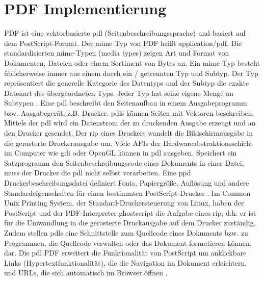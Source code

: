 \section{PDF Implementierung}
PDF ist eine vektorbasierte \gls{pdl} (Seitenbeschreibungssprache) und basiert auf dem PostScript-Format. Der \gls{mime} Typ von PDF heißt application/pdf. Die standardisierten \gls{mime}-Typen (media types) zeigen Art und Format von Dokumenten, Dateien oder einem Sortiment von Bytes an. Ein \gls{mime}-Typ besteht üblicherweise immer aus einem durch ein / getrennten Typ und Subtyp. Der Typ repräsentiert die generelle Kategorie des Datentyps und der Subtyp die exakte Datenart des übergeordneten Typs. Jeder Typ hat seine eigene Menge an Subtypen \cite{mime}. Eine \gls{pdl} beschreibt den Seitenaufbau in einem Ausgabeprogramm bzw. Ausgabegerät, z.B. Drucker. \gls{pdl}s können Seiten mit Vektoren beschreiben. Mittels der \gls{pdl} wird ein Datenstrom der zu druckenden Ausgabe erzeugt und an den Drucker gesendet. Der \gls{rip} eines Druckers wandelt die Bildschirmausgabe in die gerasterte Druckerausgabe um. Viele APIs der Hardwareabstraktionsschicht im Computer wie \gls{gdi} oder OpenGL können in \gls{pdl} ausgeben. Speichert ein Satzprogramm den Seitenbeschreibungscode eines Dokuments in einer Datei, muss der Drucker die \gls{pdl} nicht selbst verarbeiten. Eine \gls{ppd} Druckerbeschreibungsdatei definiert Fonts, Papiergröße, Auflösung und andere Standardeigenschaften für einen bestimmten PostScript-Drucker \cite{ppd-file}. Im Common Unix Printing System, der Standard-Druckersteuerung von Linux, haben der PostScript und der PDF-Interpreter ghostscript die Aufgabe eines \gls{rip}, d.h. er ist für die Umwandlung in die gerasterte Druckausgabe auf dem Drucker zuständig. Zudem stellen \gls{pdl}s eine Schnittstelle zum Quellcode eines Dokuments bzw. zu Programmen, die Quellcode verwalten oder das Dokument formatieren können, dar. Die \gls{pdl} PDF erweitert die Funktionalität von PostScript um anklickbare Links (Hypertextfunktionalität), die die Navigation im Dokument erleichtern, und URLs, die sich automatisch im Browser öffnen \cite{wiki-pdl}.

